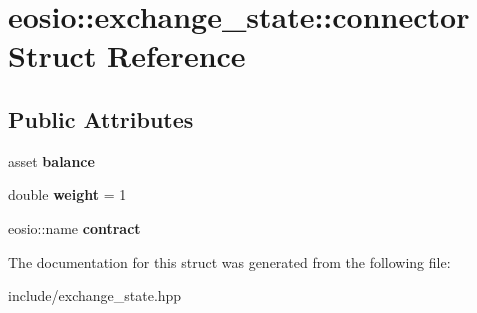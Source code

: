 \hypertarget{structeosio_1_1exchange__state_1_1connector}{}\section{eosio\+:\+:exchange\+\_\+state\+:\+:connector Struct Reference}
\label{structeosio_1_1exchange__state_1_1connector}
\subsection*{Public Attributes}
\begin{DoxyCompactItemize}
\item 
\mbox{\label{structeosio_1_1exchange__state_1_1connector_a43db131eff6f224b210e69b6fe7632d2}} 
asset {\bfseries balance}
\item 
\mbox{\label{structeosio_1_1exchange__state_1_1connector_aafdae580851779594e044bf022198bdc}} 
double {\bfseries weight} = 1
\item 
\mbox{\label{structeosio_1_1exchange__state_1_1connector_a47c23398766229ea3bb2602c9f3d56ed}} 
eosio\+::name {\bfseries contract}
\end{DoxyCompactItemize}


The documentation for this struct was generated from the following file\+:\begin{DoxyCompactItemize}
\item 
include/exchange\+\_\+state.\+hpp\end{DoxyCompactItemize}

